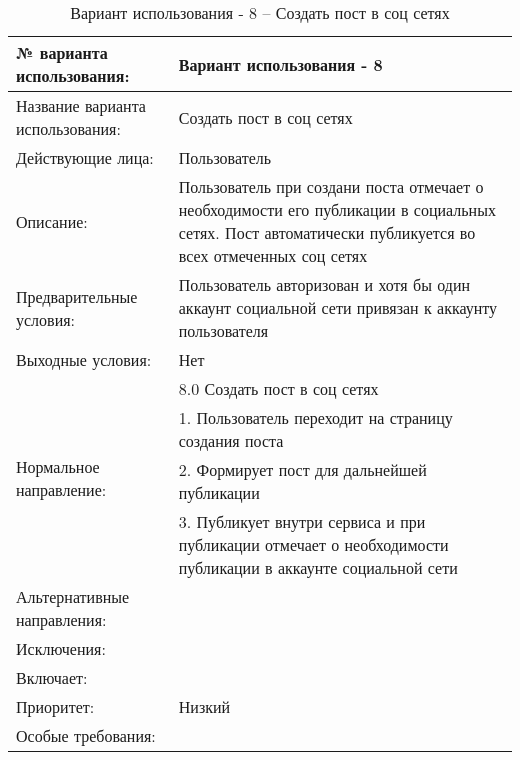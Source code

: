 \begin{table}[H]
  \caption{Вариант использования - 8 – Создать пост в соц сетях}\label{use-case-8-table}
  \begin{tabular}{|p{6cm}|p{10cm}|}
  \hline № варианта использования: & Вариант использования - 8 \\
  \hline Название варианта использования: & Создать пост в соц сетях \\
  \hline Действующие лица: & Пользователь \\
  \hline Описание: & Пользователь при создани поста отмечает о необходимости его публикации в социальных сетях. Пост автоматически публикуется во всех отмеченных соц сетях \\
  \hline Предварительные условия: & Пользователь авторизован и хотя бы один аккаунт социальной сети привязан к аккаунту пользователя \\
  \hline Выходные условия: & Нет \\
  \hline \multirow{4}{*}{Нормальное направление:} & 8.0 Создать пост в соц сетях \\
  \cline{2-2} & 1. Пользователь переходит на страницу создания поста \\
  \cline{2-2} & 2. Формирует пост для дальнейшей публикации \\
  \cline{2-2} & 3. Публикует внутри сервиса и при публикации отмечает о необходимости публикации в аккаунте социальной сети \\
  \hline Альтернативные направления: &  \\
  \hline Исключения: &  \\
  \hline Включает: &  \\
  \hline Приоритет: & Низкий \\
  \hline Особые требования: &  \\
  \hline 
  \end{tabular}
\end{table}

